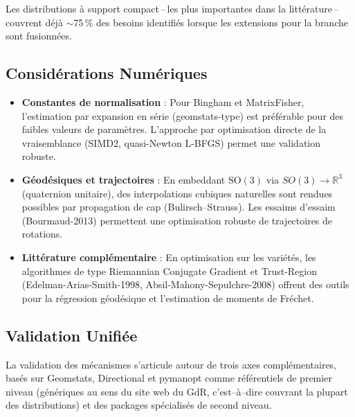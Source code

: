 \documentclass[11pt,a4paper]{article}
\begin{document}
Les distributions à support compact\,--\,les plus importantes dans la littérature\,--\,couvrent déjà $\sim$75\,\% des besoins identifiés lorsque les extensions pour la branche sont fusionnées.

\subsection{Considérations Numériques}

\begin{itemize}
    \item \textbf{Constantes de normalisation} : Pour Bingham et MatrixFisher, l'estimation par expansion en série (geomstats-type) est préférable pour des faibles valeurs de paramètres. L'approche par optimisation directe de la vraisemblance (SIMD2, quasi-Newton L-BFGS) permet une validation robuste.
    \item \textbf{Géodésiques et trajectoires} : En embeddant $\text{SO}(3)$ via $SO(3)\!\to\!\mathbb{R}^3$ (quaternion unitaire), des interpolations cubiques naturelles sont rendues possibles par propagation de cap (Bulirsch--Strauss). Les essaims d'essaim (Bourmaud-2013) permettent une optimisation robuste de trajectoires de rotations.
    \item \textbf{Littérature complémentaire} : En optimisation sur les variétés, les algorithmes de type Riemannian Conjugate Gradient et Trust-Region (Edelman-Arias-Smith-1998, Absil-Mahony-Sepulchre-2008) offrent des outils pour la régression géodésique et l'estimation de moments de Fréchet.
\end{itemize}

\subsection{Validation Unifiée}

La validation des mécanismes s'articule autour de trois axes complémentaires, basés sur Geomstats, Directional et pymanopt comme référentiels de premier niveau (génériques au sens du site web du GdR, c'est--à--dire couvrant la plupart des distributions) et des packages spécialisés de second niveau.
\end{document}
